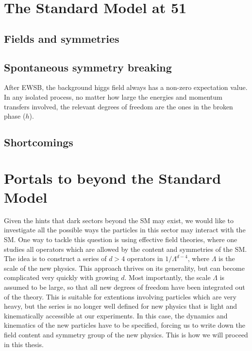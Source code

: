 \section{The Standard Model at 51}

\subsection{Fields and symmetries}

\subsection{Spontaneous symmetry breaking}

After EWSB, the background higgs field always has a non-zero expectation value. In any isolated process, no matter how large the energies and momentum transfers involved, the relevant degrees of freedom are the ones in the broken phase (\ie $h$). 

\subsection{Shortcomings}

\section{Portals to beyond the Standard Model}

Given the hints that dark sectors beyond the SM may exist, we would like to investigate all the possible ways the particles in this sector may interact with the SM. One way to tackle this question is using effective field theories, where one studies all operators which are allowed by the content and symmetries of the SM. The idea is to construct a series of $d>4$ operators in $1/\Lambda^{d-4}$, where $\Lambda$ is the scale of the new physics. This approach thrives on its generality, but can become complicated very quickly with growing $d$. Most importantly, the scale $\Lambda$ is assumed to be large, so that all new degrees of freedom have been integrated out of the theory. This is suitable for extentions involving particles which are very heavy, but the series is no longer well defined for new physics that is light and kinematically accessible at our experiments. In this case, the dynamics and kinematics of the new particles have to be specified, forcing us to write down the field content and symmetry group of the new physics. This is how we will proceed in this thesis.


